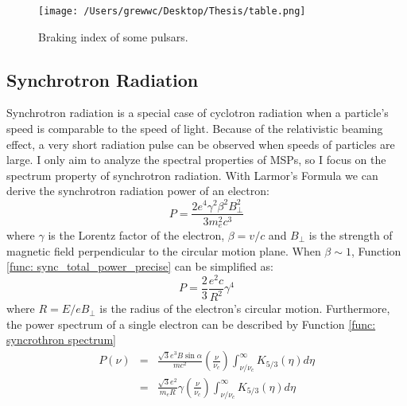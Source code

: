 \documentclass[12pt]{report}
\begin{document}
        \begin{figure}[!ht]
          \centering
          \texttt{[image: /Users/grewwc/Desktop/Thesis/table.png]}
          \caption{Braking index of some pulsars.}
          \label{fig:braking_index}
        \end{figure}
    
        \subsection{Synchrotron Radiation}
          Synchrotron radiation is a special case of cyclotron radiation when a particle's
          speed is comparable to the speed of light. Because of the relativistic beaming 
          effect, a very short radiation pulse can be observed when speeds of particles are
          large. I only aim to analyze the spectral properties of MSPs, so I focus on the 
          spectrum property of synchrotron radiation. 
          With Larmor's Formula we can derive the synchrotron radiation power of an electron:
          \begin{equation}
            \label{func: sync_total_power_precise}
            P = \frac{2e^4\gamma^2\beta^2B_{\perp}^2}{3m_e^2c^3} 
          \end{equation}
          where $\gamma$ is the Lorentz factor of the electron, $\beta=v/c$ and $B_{\perp}$ 
          is the strength of magnetic field perpendicular to the circular motion plane. 
          When $\beta \sim 1$, Function \ref{func: sync_total_power_precise} can be 
          simplified as:
          \begin{equation}
            \label{func: sync_total_power_simplified}
            P = \frac{2}{3}\frac{e^2c}{R^2}\gamma^4
          \end{equation}
          where $R = E / e B_{\perp}$ is the radius of the electron's circular motion. 
          Furthermore, the power spectrum of a single electron  
          can be described by Function \ref{func: syncrothron spectrum}
          \begin{eqnarray}
          \label{func: syncrothron spectrum}
            P\left(\nu\right) &=& \frac{\sqrt{3} e^3 B \sin{\alpha}}{m c^2} 
              \left(\frac{\nu}{\nu_c}\right) \int_{\nu / \nu_c}^{\infty} K_{5/3}\left(\eta \right)d\eta  \nonumber \\
              &=& \frac{\sqrt{3}e^2}{m_eR}\gamma \left(\frac{\nu}{\nu_c}\right) \int_{\nu / \nu_c}^{\infty} K_{5/3}\left(\eta \right)d\eta
          \end{eqnarray}
\end{document}
